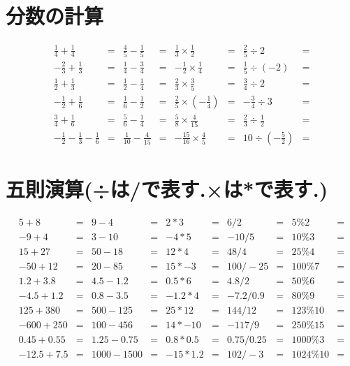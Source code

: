 \documentclass[paper=b4j,landscape,twocolumn,fleqn]{jlreq}
\begin{document}
\section{分数の計算}
\begin{align*}
    \frac{1}{4} + \frac{1}{4} &= & \frac{4}{5} - \frac{1}{5} &= & \frac{1}{3} \times \frac{1}{2} &= & \frac{2}{5} \div 2 &= \\
    -\frac{2}{3} + \frac{1}{3} &= & \frac{1}{4} - \frac{3}{4} &= & -\frac{1}{2} \times \frac{1}{4} &= & \frac{1}{5} \div (-2) &= \\
    \frac{1}{2} + \frac{1}{3} &= & \frac{1}{2} - \frac{1}{4} &= & \frac{2}{3} \times \frac{3}{5} &= & \frac{3}{4} \div 2 &= \\
    -\frac{1}{2} + \frac{1}{6} &= & \frac{1}{6} - \frac{1}{2} &= & \frac{2}{5} \times \left(-\frac{1}{4}\right) &= & -\frac{3}{4} \div 3 &= \\
    \frac{3}{4} + \frac{1}{6} &= & \frac{5}{6} - \frac{1}{4} &= & \frac{5}{8} \times \frac{4}{15} &= & \frac{2}{3} \div \frac{1}{2} &= \\
    -\frac{1}{2} - \frac{1}{3} - \frac{1}{6} &= & \frac{1}{10} - \frac{4}{15} &= & -\frac{15}{16} \times \frac{4}{5} &= & 10 \div \left(-\frac{5}{2}\right) &= 
\end{align*}

\newpage
\section{五則演算(÷は/で表す.×は*で表す.)}
\begin{align*}
    5+8 &= & 9-4 &= & 2*3 &= & 6/2 &= & 5\%2 &= \\
    -9+4 &= & 3-10 &= & -4*5 &= & -10/5 &= & 10\%3 &= \\
    15+27 &= & 50-18 &= & 12*4 &= & 48/4 &= & 25\%4 &= \\
    -50+12 &= & 20-85 &= & 15*-3 &= & 100/-25 &= & 100\%7 &= \\
    1.2+3.8 &= & 4.5-1.2 &= & 0.5*6 &= & 4.8/2 &= & 50\%6 &= \\
    -4.5+1.2 &= & 0.8-3.5 &= & -1.2*4 &= & -7.2/0.9 &= & 80\%9 &= \\
    125+380 &= & 500-125 &= & 25*12 &= & 144/12 &= & 123\%10 &= \\
    -600+250 &= & 100-456 &= & 14*-10 &= & -117/9 &= & 250\%15 &= \\
    0.45+0.55 &= & 1.25-0.75 &= & 0.8*0.5 &= & 0.75/0.25 &= & 1000\%3 &= \\
    -12.5+7.5 &= & 1000-1500 &= & -15*1.2 &= & 102/-3 &= & 1024\%10 &= 
\end{align*}
\end{document}
